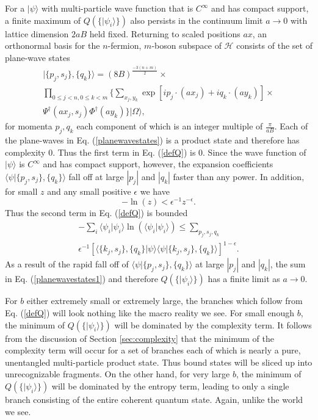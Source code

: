 \documentclass[12pt,amsmath,amssymb,onecolumn]{revtex4-2}
\begin{document}
For a $|\psi \rangle $ with multi-particle
wave function that is $C^\infty$ and has compact support, a
finite maximum of $Q( \{|\psi_i \rangle \})$ also persists in the continuum
limit $a \rightarrow 0$ with lattice dimension $2aB$ held fixed.
Returning to scaled positions $ax$, 
an orthonormal basis for the $n$-fermion, $m$-boson subspace of $\mathcal{H}$ 
consists of the set of 
plane-wave states
\begin{multline}
\label{planewavestates}
| \{p_j, s_j\}, \{q_k\} \rangle  = (8B)^{\frac{-3(n+m)}{2}} \times \\
\prod_{0 \le j < n, 0 \le k < m} \{\sum_{x_j, y_k}
\exp[ i p_j \cdot (a x_j) + i q_k \cdot (a y_k)] \times \\
\Psi^\dagger(a x_j, s_j)\Phi^\dagger(a y_k) \}|\Omega \rangle ,
\end{multline}  
for momenta $p_j, q_k$ each component of which is
an integer multiple of $\frac{ \pi}{a B}$.
Each of the plane-waves in Eq. (\ref{planewavestates}) 
is a product state and therefore has complexity 0.
Thus the first term in Eq. (\ref{defQ}) is 0.
Since the wave function of $|\psi \rangle $ is $C^\infty$ and has
compact support, however,
the expansion coefficients $\langle \psi | \{p_j, s_j\}, \{q_k\} \rangle $ fall
off at large $|p_j|$ and $ |q_k|$ faster than any power.
In addition, for small $z$ and any small
positive $\epsilon$ we have
\begin{equation}
\label{epsilonbound}
-\ln( z) < \epsilon^{-1} z^{-\epsilon}.
\end{equation}
Thus
the second term in Eq. (\ref{defQ}) is bounded 
\begin{multline}
\label{planewavestates1}
-\sum_i  \langle  \psi_i | \psi_i \rangle  \ln(  \langle  \psi_i |\psi_i \rangle ) \le
\sum_{p_j,s_j, q_k} \\ \epsilon^{-1}[ \langle  \{k_j,s_j\}, \{ q_k\}|\psi \rangle   \langle \psi|\{k_j,s_j\}, \{ q_k\} \rangle ]^{1-\epsilon}.
\end{multline}
As a result of the rapid fall off of $ \langle  \psi | \{p_j, s_j\}, \{q_k\} \rangle $ at large $|p_j|$ and $|q_k|$,
the sum in Eq. (\ref{planewavestates1}) and therefore $Q( \{|\psi_i \rangle \})$
has a finite limit as $a \rightarrow 0$.

For $b$ either 
extremely small or extremely large, the branches which follow from Eq. (\ref{defQ}) 
will
look nothing like the macro reality we see.  For small enough $b$,
the minimum of $Q( \{|\psi_i \rangle \})$ will be dominated by the complexity term.
It follows from the discussion of Section \ref{sec:complexity}
that the minimum of the complexity term will occur for a set of branches each of which is nearly
a pure, unentangled multi-particle product state. Thus bound states
will be sliced up into unrecognizable fragments. On the
other hand, for very large $b$, the minimum of $Q( \{|\psi_i \rangle \})$
will be dominated by the entropy term, leading to only 
a single branch consisting of the entire coherent quantum state. 
Again, unlike the world we see.
\end{document}
